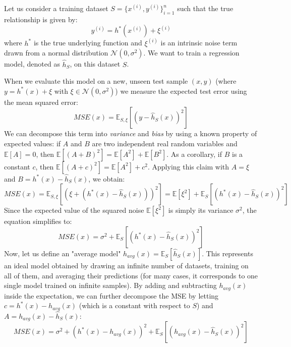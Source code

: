 Let us consider a training dataset $S = \{x^{(i)}, y^{(i)}\}_{i=1}^n$ such that the true relationship is given by:
\begin{equation}
    y^{(i)} = h^*(x^{(i)}) + \xi^{(i)}
\end{equation}
where $h^*$ is the true underlying function and $\xi^{(i)}$ is an intrinsic noise term drawn from a normal distribution $\mathcal{N}(0, \sigma^2)$. We want to train a regression model, denoted as $\hat{h}_S$, on this dataset $S$.

When we evaluate this model on a new, unseen test sample $(x, y)$ (where $y = h^*(x) + \xi$ with $\xi \in \mathcal{N}(0, \sigma^2)$) we measure the expected test error using the mean squared error:
\begin{equation}
    MSE(x) = \mathbb{E}_{S,\xi}\left[(y - \hat{h}_S(x))^2\right]
\end{equation}
We can decompose this term into \textit{variance} and \textit{bias} by using a known property of expected values: if $A$ and $B$ are two independent real random variables and $\mathbb{E}[A]=0$, then $\mathbb{E}[(A+B)^2] = \mathbb{E}[A^2] + \mathbb{E}[B^2]$. As a corollary, if $B$ is a constant $c$, then $\mathbb{E}[(A+c)^2] = \mathbb{E}[A^2] + c^2$. Applying this claim with $A = \xi$ and $B = h^*(x) - \hat{h}_S(x)$, we obtain:
\begin{equation}
    MSE(x) = \mathbb{E}_{S,\xi}\left[ \left(\xi + (h^*(x) - \hat{h}_S(x))\right)^2 \right] = \mathbb{E}[\xi^2] + \mathbb{E}_S\left[(h^*(x) - \hat{h}_S(x))^2\right]
\end{equation}
Since the expected value of the squared noise $\mathbb{E}[\xi^2]$ is simply its variance $\sigma^2$, the equation simplifies to:
\begin{equation}
    MSE(x) = \sigma^2 + \mathbb{E}_S\left[(h^*(x) - \hat{h}_S(x))^2\right]
\end{equation}
Now, let us define an "average model" $h_{avg}(x) = \mathbb{E}_S[\hat{h}_S(x)]$. This represents an ideal model obtained by drawing an infinite number of datasets, training on all of them, and averaging their predictions (for many cases, it corresponds to one single model trained on infinite samples). By adding and subtracting $h_{avg}(x)$ inside the expectation, we can further decompose the MSE by letting $c = h^*(x) - h_{avg}(x)$ (which is a constant with respect to $S$) and $A = h_{avg}(x) - \hat{h}_S(x)$:
\begin{equation}
    MSE(x) = \sigma^2 + (h^*(x) - h_{avg}(x))^2 + \mathbb{E}_S\left[(h_{avg}(x) - \hat{h}_S(x))^2\right]
\end{equation}
